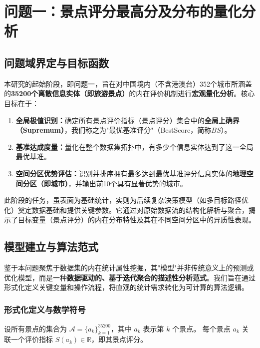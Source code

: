 \section{问题一：景点评分最高分及分布的量化分析}

\subsection{问题域界定与目标函数}

本研究的起始阶段，即问题一，旨在对中国境内（不含港澳台）352个城市所涵盖的\textbf{35200个离散信息实体（即旅游景点）}的内在评价机制进行\textbf{宏观量化分析}。核心目标在于：

\begin{enumerate}
    \item \textbf{全局极值识别：}确定所有景点评价指标（景点评分）集合中的\textbf{全局上确界（Supremum）}，我们称之为"最优基准评分"（BestScore，简称$BS$）。
    \item \textbf{基准达成度量：}量化在整个数据集拓扑中，有多少个信息实体达到了这一全局最优基准。
    \item \textbf{空间分区优势评估：}识别并排序拥有最多达到最优基准评分信息实体的\textbf{地理空间分区（即城市）}，并输出前10个具有显著优势的城市。
\end{enumerate}

此阶段的任务，虽表面为基础统计，实则为后续复杂决策模型（如多目标路径优化）奠定数据基础和提供关键参数。它通过对原始数据流的结构化解析与聚合，揭示了目标变量（景点评分）的内在分布特性及其在不同空间分区中的异质性表现。

\subsection{模型建立与算法范式}

鉴于本问题聚焦于数据集的内在统计属性挖掘，其"模型"并非传统意义上的预测或优化模型，而是一种\textbf{数据驱动的、基于迭代聚合的描述性分析范式}。我们旨在通过形式化定义关键变量和操作流程，将直观的统计需求转化为可计算的算法逻辑。

\subsubsection{形式化定义与数学符号}

设所有景点的集合为 $\mathcal{A} = \{a_k\}_{k=1}^{35200}$，其中 $a_k$ 表示第 $k$ 个景点。
每个景点 $a_k$ 关联一个评价指标 $S(a_k) \in \mathbb{R}$，即其景点评分。


